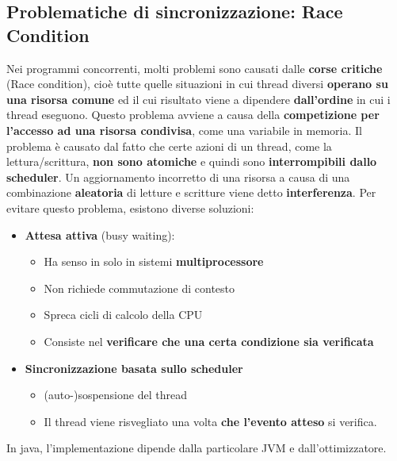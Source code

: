 \documentclass[12pt]{article}
\begin{document}
\subsection{Problematiche di sincronizzazione: Race Condition}
Nei programmi concorrenti, molti problemi sono causati dalle \textbf{corse critiche} (Race condition), cioè tutte quelle situazioni in cui thread diversi \textbf{operano su una risorsa comune} ed il cui risultato viene a dipendere \textbf{dall'ordine} in cui i thread eseguono. Questo problema avviene a causa della \textbf{competizione per l'accesso ad una risorsa condivisa}, come una variabile in memoria. Il problema è causato dal fatto che certe azioni di un thread, come la lettura/scrittura, \textbf{non sono atomiche} e quindi sono \textbf{interrompibili dallo scheduler}. Un aggiornamento incorretto di una risorsa a causa di una combinazione \textbf{aleatoria} di letture e scritture viene detto \textbf{interferenza}. Per evitare questo problema, esistono diverse soluzioni:
\begin{itemize}
    \item \textbf{Attesa attiva} (busy waiting):
          \begin{itemize}
              \item Ha senso in solo in sistemi \textbf{multiprocessore}
              \item Non richiede commutazione di contesto
              \item Spreca cicli di calcolo della CPU
              \item Consiste nel \textbf{verificare che una certa condizione sia verificata}
          \end{itemize}
    \item \textbf{Sincronizzazione basata sullo scheduler}
          \begin{itemize}
              \item (auto-)sospensione del thread
              \item Il thread viene risvegliato una volta \textbf{che l'evento atteso} si verifica.
          \end{itemize}
\end{itemize}
In java, l'implementazione dipende dalla particolare JVM e dall'ottimizzatore.
\end{document}
